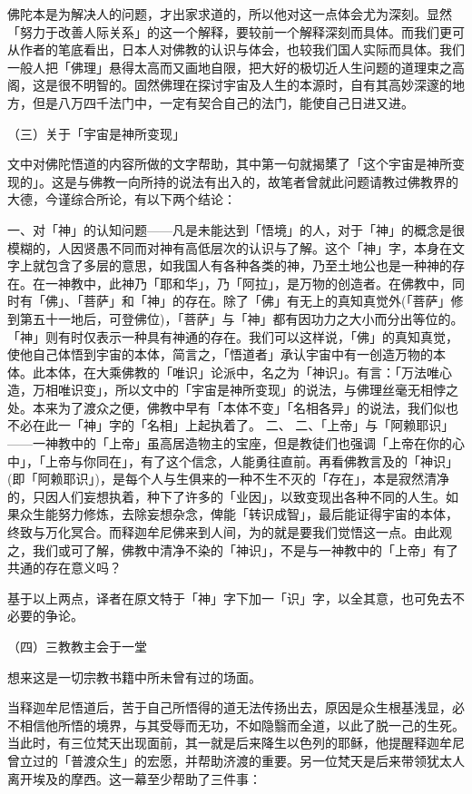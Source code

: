 \documentclass[12pt,twoside,openany]{book}
\begin{document}
佛陀本是为解决人的问题，才出家求道的，所以他对这一点体会尤为深刻。显然「努力于改善人际关系」的这一个解释，要较前一个解释深刻而具体。而我们更可从作者的笔底看出，日本人对佛教的认识与体会，也较我们国人实际而具体。我们一般人把「佛理」悬得太高而又画地自限，把大好的极切近人生问题的道理束之高阁，这是很不明智的。固然佛理在探讨宇宙及人生的本源时，自有其高妙深邃的地方，但是八万四千法门中，一定有契合自己的法门，能使自己日进又进。

（三）关于「宇宙是神所变现」

文中对佛陀悟道的内容所做的文字帮助，其中第一句就揭橥了「这个宇宙是神所变现的」。这是与佛教一向所持的说法有出入的，故笔者曾就此问题请教过佛教界的大德，今谨综合所论，有以下两个结论：

一、对「神」的认知问题——凡是未能达到「悟境」的人，对于「神」的概念是很模糊的，人因贤愚不同而对神有高低层次的认识与了解。这个「神」字，本身在文字上就包含了多层的意思，如我国人有各种各类的神，乃至土地公也是一种神的存在。在一神教中，此神乃「耶和华」，乃「阿拉」，是万物的创造者。在佛教中，同时有「佛」、「菩萨」和「神」的存在。除了「佛」有无上的真知真觉外(「菩萨」修到第五十一地后，可登佛位)，「菩萨」与「神」都有因功力之大小而分出等位的。「神」则有时仅表示一种具有神通的存在。我们可以这样说，「佛」的真知真觉，使他自己体悟到宇宙的本体，简言之，「悟道者」承认宇宙中有一创造万物的本体。此本体，在大乘佛教的「唯识」论派中，名之为「神识」。有言：「万法唯心造，万相唯识变」，所以文中的「宇宙是神所变现」的说法，与佛理丝毫无相悖之处。本来为了渡众之便，佛教中早有「本体不变」「名相各异」的说法，我们似也不必在此一「神」字的「名相」上起执着了。
二、
二、「上帝」与「阿赖耶识」——一神教中的「上帝」虽高居造物主的宝座，但是教徒们也强调「上帝在你的心中」，「上帝与你同在」，有了这个信念，人能勇往直前。再看佛教言及的「神识」(即「阿赖耶识」)，是每个人与生俱来的一种不生不灭的「存在」，本是寂然清净的，只因人们妄想执着，种下了许多的「业因」，以致变现出各种不同的人生。如果众生能努力修炼，去除妄想杂念，俾能「转识成智」，最后能证得宇宙的本体，终致与万化冥合。而释迦牟尼佛来到人间，为的就是要我们觉悟这一点。由此观之，我们或可了解，佛教中清净不染的「神识」，不是与一神教中的「上帝」有了共通的存在意义吗？

基于以上两点，译者在原文特于「神」字下加一「识」字，以全其意，也可免去不必要的争论。

（四）三教教主会于一堂

想来这是一切宗教书籍中所未曾有过的场面。

当释迦牟尼悟道后，苦于自己所悟得的道无法传扬出去，原因是众生根基浅显，必不相信他所悟的境界，与其受辱而无功，不如隐翳而全道，以此了脱一己的生死。当此时，有三位梵天出现面前，其一就是后来降生以色列的耶稣，他提醒释迦牟尼曾立过的「普渡众生」的宏愿，并帮助济渡的重要。另一位梵天是后来带领犹太人离开埃及的摩西。这一幕至少帮助了三件事：
\end{document}
